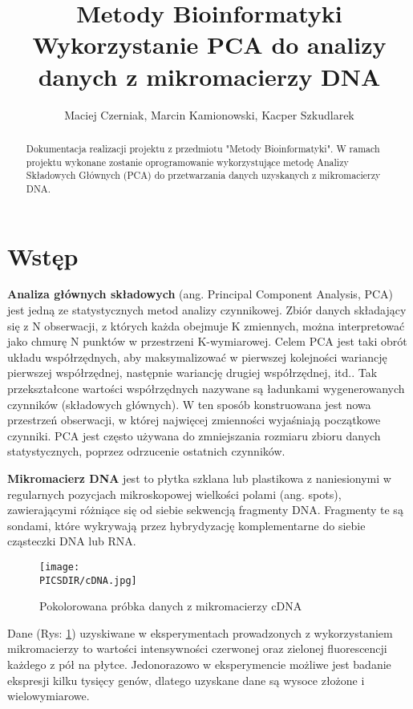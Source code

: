 \documentclass[a4paper,12pt]{article}
\def\PICSDIR{PICS}
\begin{document}
\title{{\small Metody Bioinformatyki}\\Wykorzystanie PCA do analizy danych z mikromacierzy DNA}
\author{Maciej Czerniak, Marcin Kamionowski, Kacper Szkudlarek}

\maketitle

\begin{abstract}
Dokumentacja realizacji projektu z przedmiotu "Metody Bioinformatyki". W ramach projektu wykonane zostanie oprogramowanie wykorzystujące metodę Analizy Składowych Głównych (PCA) do przetwarzania danych uzyskanych z mikromacierzy DNA.
\end{abstract}


\section{Wstęp}
\textbf{Analiza głównych składowych} (ang. Principal Component Analysis, PCA) jest jedną ze statystycznych metod analizy czynnikowej. Zbiór danych składający się z N obserwacji, z których każda obejmuje K zmiennych, można interpretować jako chmurę N punktów w przestrzeni K-wymiarowej. Celem PCA jest taki obrót układu współrzędnych, aby maksymalizować w pierwszej kolejności wariancję pierwszej współrzędnej, następnie wariancję drugiej współrzędnej, itd.. Tak przekształcone wartości współrzędnych nazywane są ładunkami wygenerowanych czynników (składowych głównych). W ten sposób konstruowana jest nowa przestrzeń obserwacji, w której najwięcej zmienności wyjaśniają początkowe czynniki. PCA jest często używana do zmniejszania rozmiaru zbioru danych statystycznych, poprzez odrzucenie ostatnich czynników.

\textbf{Mikromacierz DNA} jest to płytka szklana lub plastikowa z naniesionymi w regularnych pozycjach mikroskopowej wielkości polami (ang. spots), zawierającymi różniące się od siebie sekwencją fragmenty DNA. Fragmenty te są sondami, które wykrywają przez hybrydyzację komplementarne do siebie cząsteczki DNA lub RNA.

\begin{figure}
\centering
\texttt{[image: \\PICSDIR/cDNA.jpg]}
\caption{Pokolorowana próbka danych z mikromacierzy cDNA}
\label{rys:cDNA}
\end{figure}

Dane (Rys: \ref{rys:cDNA}) uzyskiwane w eksperymentach prowadzonych z wykorzystaniem mikromacierzy to wartości intensywności czerwonej oraz zielonej fluorescencji każdego z pół na płytce. Jedonorazowo w eksperymencie możliwe jest badanie ekspresji kilku tysięcy genów, dlatego uzyskane dane są wysoce złożone i wielowymiarowe.
\end{document}
